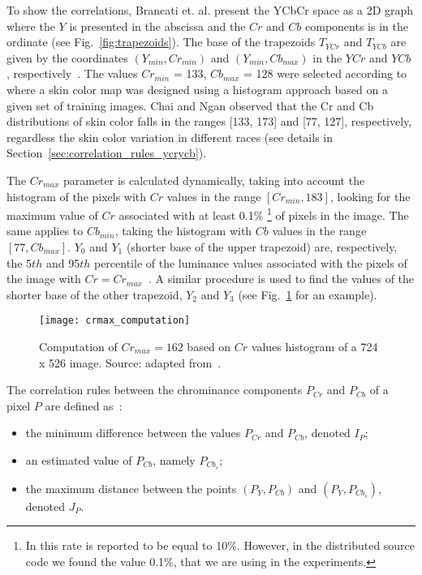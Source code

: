 To show the correlations, Brancati et. al. present the YCbCr space as a 2D graph where the $Y$ is presented in the abscissa and the $Cr$ and $Cb$ components is in the ordinate (see Fig.~\ref{fig:trapezoids}). The base of the trapezoids $T_{YCr}$ and $T_{YCb}$ are given by the coordinates $(Y_{min}, Cr_{min})$ and $(Y_{min}, Cb_{max})$ in the $YCr$ and $YCb$ , respectively~\citep{brancati:17}. The values $Cr_{min}$ = 133, $Cb_{max}$ = 128 were selected according to~\citet{chai:99} where a skin color map was designed using a histogram approach based on a given set of training images. Chai and Ngan observed that the Cr and Cb distributions of skin color falls in the ranges [133, 173] and [77, 127], respectively, regardless the skin color variation in different races (see details in Section~\ref{sec:correlation_rules_ycrycb}).

The $Cr_{max}$ parameter is calculated dynamically, taking into account the histogram of the pixels with $Cr$ values in the range $[Cr_{min}, 183]$, looking for the maximum value of $Cr$ associated with at least 0.1\% \footnote{In \citet{brancati:17} this rate is reported to be equal to 10\%. However, in the distributed source code we found the value 0.1\%, that we are using in the experiments.} of pixels in the image. The same applies to $Cb_{min}$, taking the histogram with $Cb$ values in the range $[77, Cb_{max}]$. $Y_0$ and $Y_1$ (shorter base of the upper trapezoid) are, respectively, the 5${th}$ and 95$th$ percentile of the luminance values associated with the pixels of the image with $Cr = Cr_{max}$~\citep{brancati:17}. A similar procedure is used to find the values of the shorter base of the other trapezoid, $Y_2$ and $Y_3$ (see Fig.~\ref{fig:crmax_computation} for an example).

\begin{figure}[ht]
    \centering
    \texttt{[image: crmax\_computation]}
    \caption[Computation of $Cr_{max}$ based on $Cr$ values histogram of a 724 x 526 image]{Computation of $Cr_{max} = 162$ based on $Cr$ values histogram of a 724 x 526 image. Source: adapted from~\citep{brancati:17}.}
    \label{fig:crmax_computation}
\end{figure}

The correlation rules between the chrominance components $P_{Cr}$ and $P_{Cb}$ of a pixel $P$ are defined as~\citep{brancati:17}:
\begin{itemize}
    \item the minimum difference between the values $P_{Cr}$ and $P_{Cb}$, denoted $I_P$;
    \item an estimated value of $P_{Cb}$, namely $P_{Cb_s}$;
    \item the maximum distance between the points $(P_Y, P_{Cb})$ and $(P_Y, P_{Cb_s})$, denoted $J_P$.
\end{itemize}

